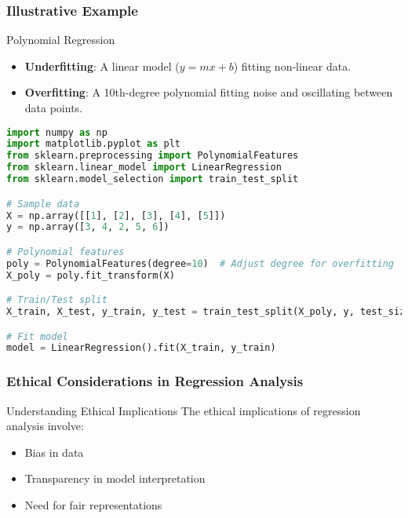 \documentclass[aspectratio=169]{beamer}
\begin{document}
\begin{frame}[fragile]
    \frametitle{Illustrative Example}
    \begin{block}{Polynomial Regression}
        \begin{itemize}
            \item \textbf{Underfitting}: A linear model (\(y = mx + b\)) fitting non-linear data.
            \item \textbf{Overfitting}: A 10th-degree polynomial fitting noise and oscillating between data points.
        \end{itemize}
    \end{block}
    \begin{lstlisting}[language=python]
import numpy as np
import matplotlib.pyplot as plt
from sklearn.preprocessing import PolynomialFeatures
from sklearn.linear_model import LinearRegression
from sklearn.model_selection import train_test_split

# Sample data
X = np.array([[1], [2], [3], [4], [5]])
y = np.array([3, 4, 2, 5, 6])

# Polynomial features
poly = PolynomialFeatures(degree=10)  # Adjust degree for overfitting
X_poly = poly.fit_transform(X)

# Train/Test split
X_train, X_test, y_train, y_test = train_test_split(X_poly, y, test_size=0.2)

# Fit model
model = LinearRegression().fit(X_train, y_train)
    \end{lstlisting}
\end{frame}

\begin{frame}[fragile]
    \frametitle{Ethical Considerations in Regression Analysis}
    \begin{block}{Understanding Ethical Implications}
        The ethical implications of regression analysis involve:
        \begin{itemize}
            \item Bias in data
            \item Transparency in model interpretation
            \item Need for fair representations
        \end{itemize}
    \end{block}
\end{frame}
\end{document}
